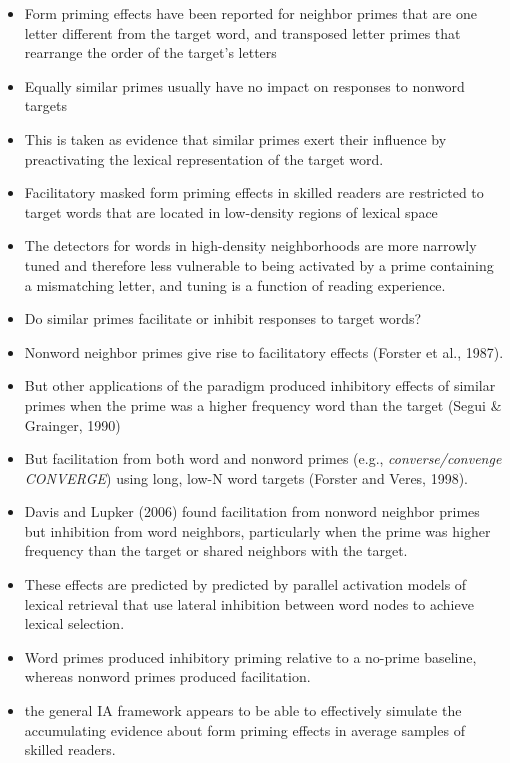 \documentclass[]{article}
\begin{document}
{\begin{itemize}
			\item  Form priming effects have been reported for neighbor primes that are one letter different from the target word, and transposed letter primes that rearrange the order of the target’s letters
			\item Equally similar primes usually have no impact on responses to nonword targets
			\item This is taken as evidence that similar primes exert their influence by preactivating the lexical representation of the target word. 
			\item Facilitatory masked form priming effects in skilled readers  are restricted to target words that are located in low-density regions of lexical space
			\item The detectors for words in high-density neighborhoods are more narrowly tuned and therefore less vulnerable to being activated by a prime containing a mismatching letter, and tuning is a function of reading experience.
			\item Do similar primes facilitate or inhibit responses to target words?
			\item Nonword neighbor primes give rise to facilitatory effects (Forster et al., 1987).
			\item But other applications of the paradigm produced inhibitory effects of similar primes when the prime was a higher frequency word than the target (Segui \& Grainger, 1990)
			\item But facilitation from both word and nonword primes (e.g., \textit{converse/convenge CONVERGE}) using long, low-N word targets (Forster and Veres, 1998).
			\item Davis and Lupker (2006) found facilitation from nonword neighbor primes but inhibition from word neighbors, particularly when the prime was higher frequency than the target or shared neighbors with the target.
			\item These effects are predicted by  predicted by parallel activation 	models of lexical retrieval that use lateral inhibition between word nodes to achieve lexical selection. 
			\item Word primes produced inhibitory priming relative to a no-prime baseline, whereas nonword primes produced facilitation.
			\item the general IA framework appears to be able to effectively simulate the accumulating evidence about form priming effects in average samples of skilled readers.
	\end{itemize}
	
}
\end{document}
